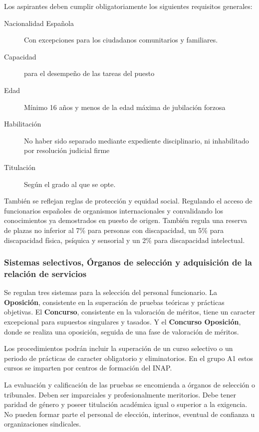         Los aspirantes deben cumplir obligatoriamente los siguientes requisitos generales:
        \begin{description}
            \item[Nacionalidad Española] Con excepciones para los ciudadanos comunitarios y familiares.
            \item[Capacidad] para el desempeño de las tareas del puesto
            \item[Edad] Mínimo 16 años y menos de la edad máxima de jubilación forzosa
            \item[Habilitación] No haber sido separado mediante expediente disciplinario, ni inhabilitado por resolución judicial firme
            \item[Titulación] Según el grado al que se opte.
        \end{description}

        También se reflejan reglas de protección y equidad social. Regulando el acceso de funcionarios españoles de organismos internacionales y convalidando los conocimientos ya demostrados en puesto de origen. También regula una reserva de plazas no inferior al 7\% para personas con discapacidad, un 5\% para discapacidad física, psíquica y sensorial y un 2\% para discapacidad intelectual.

    \subsubsection{Sistemas selectivos, Órganos de selección y adquisición de la relación de servicios} %
        Se regulan tres sistemas para la selección del personal funcionario. La \textbf{Oposición}, consistente en la superación de pruebas teóricas y prácticas objetivas. El \textbf{Concurso}, consistente en la valoración de méritos, tiene un caracter excepcional para supuestos singulares y tasados. Y el \textbf{Concurso Oposición}, donde se realiza una oposición, seguida de una fase de valoración de méritos.

        Los procedimientos podrán incluir la superación de un curso selectivo o un periodo de prácticas de caracter obligatorio y eliminatorios. En el grupo A1 estos cursos se imparten por centros de formación del INAP.

        La evaluación y calificación de las pruebas se encomienda a órganos de selección o tribunales. Deben ser imparciales y profesionalmente meritorios. Debe tener paridad de género y poseer titulación académica igual o superior a la exigencia. No pueden formar parte el personal de elección, interinos, eventual de confianza u organizaciones sindicales.

